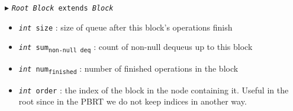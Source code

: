 \documentclass[10pt]{article}
\newcommand{\sub}[1]{\textsubscript{#1}}
\renewcommand{\tt}[1]{\texttt{#1}}
\renewcommand{\sl}[1]{\textsl{#1}}
\theoremstyle{definition}
\begin{document}
\begin{algorithm}
\begin{algorithmic}[1]
\begin{multicols}{2}
\Statex $\blacktriangleright$ \tt{\sl{Root Block} extends \sl{Block}}
\begin{itemize}
  \item \tt{\sl{int} size}
  \textsf{: size of queue after this block's operations finish}
  \item \tt{\sl{int} sum\sub{non-null deq}}
  \textsf{: count of non-null dequeus up to this block}
  \item \tt{\sl{int} num\sub{finished}}
  \textsf{: number of finished operations in the block}
    \item \tt{\sl{int} order}
  \textsf{: the index of the block in the node containing it. Useful in the root since in the PBRT we do not keep indices in another way.}
\end{itemize}

\end{multicols}
\end{algorithmic}
\end{algorithm}


\end{document}
